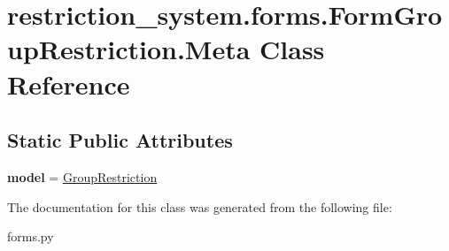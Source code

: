 \hypertarget{classrestriction__system_1_1forms_1_1FormGroupRestriction_1_1Meta}{}\section{restriction\+\_\+system.\+forms.\+Form\+Group\+Restriction.\+Meta Class Reference}
\label{classrestriction__system_1_1forms_1_1FormGroupRestriction_1_1Meta}
\subsection*{Static Public Attributes}
\begin{DoxyCompactItemize}
\item 
\hypertarget{classrestriction__system_1_1forms_1_1FormGroupRestriction_1_1Meta_a3b148e98b4f153bb4bd060f0754c3c28}{}{\bfseries model} = \hyperlink{classrestriction__system_1_1models_1_1GroupRestriction}{Group\+Restriction}\label{classrestriction__system_1_1forms_1_1FormGroupRestriction_1_1Meta_a3b148e98b4f153bb4bd060f0754c3c28}

\end{DoxyCompactItemize}


The documentation for this class was generated from the following file\+:\begin{DoxyCompactItemize}
\item 
forms.\+py\end{DoxyCompactItemize}
